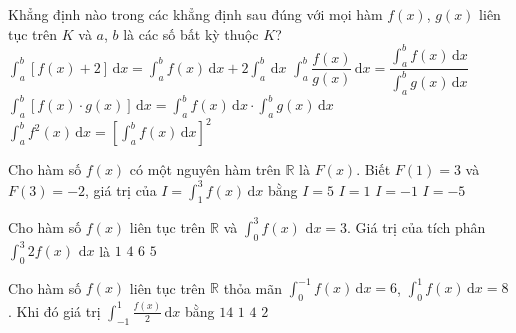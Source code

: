 \begin{ex}%
	Khẳng định nào trong các khẳng định sau đúng với mọi hàm $f(x)$, $g(x)$ liên tục trên $K$ và $a$, $b$ là các số bất kỳ  thuộc $K$?
	\choice 
		{\True $\displaystyle\int_a^b\left[f(x)+2\right]\mathrm{\,d}x=\displaystyle\int_a^b  f(x)\mathrm{\,d}x+2\displaystyle\int_a^b \mathrm{\,d}x$}
		{$\displaystyle\int_a^b \dfrac{f(x)}{g(x)}\mathrm{\,d}x=\dfrac{\displaystyle\int_a^b f(x)\mathrm{\,d}x}{\displaystyle\int_a^b g(x)  \mathrm{\,d}x}$}
		{$\displaystyle\int_a^b\left[f(x) \cdot g(x)\right] \mathrm{\,d}x=\displaystyle\int_a^b f(x) \mathrm{\,d}x \cdot \displaystyle\int_a^b g(x) \mathrm{\,d}x$} 
		{$\displaystyle\int_a^b f^2(x) \mathrm{\,d}x=\left[\displaystyle\int_a^b  f(x) \mathrm{\,d}x\right]^2$}
\end{ex}

\begin{ex}%
	Cho hàm số $f(x)$ có một nguyên hàm trên $\mathbb{R}$  là $F(x)$. Biết $F(1)=3$ và $F(3)=-2$, giá trị của $I=\displaystyle\int_{1}^{3}f(x)\mathrm{\,d}{x}$ bằng
	 \choice
		 {$I=5$}
		 {$I=1$}
		{$I=-1$} 
		{\True  $I=-5$}
\end{ex}

\begin{ex}%
	Cho hàm số $f(x)$ liên tục trên $\mathbb{R}$ và $\displaystyle\int_0^3 f(x)\,\mathrm{\,d}x = 3$. Giá trị của tích phân $\displaystyle\int_0^3 2f(x)\,\mathrm{\,d}x$  là
	\choice 
		 {$1$}
		 {$4$}
		{\True  $6$}
		 {$5$}
\end{ex}

\begin{ex}%
	Cho hàm số $f(x)$ liên tục trên $\mathbb{R}$ thỏa mãn $\displaystyle\int_{0}^{-1} f(x) \mathrm{\,d}x=6$,  $\displaystyle\int_{0}^{1} f(x) \mathrm{\,d}x=8$. Khi đó giá trị $\displaystyle\int_{-1}^{1} \frac{f(x)}{2} \mathrm{\,d}x$ bằng
	\choice 
		 {$14$}
		{\True $1$} 
		 {$4$}
		{$2$} 
\end{ex}

